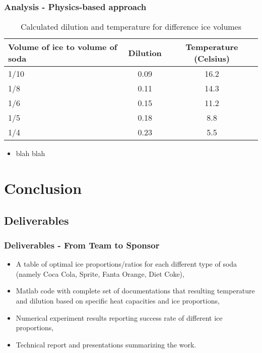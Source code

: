 \documentclass[compress,handout,10pt]{beamer}
\let\olditem\item
\renewcommand{\item}{\setlength{\itemsep}{0.5\baselineskip}\olditem}
\begin{document}
\begin{frame}
    \frametitle{Analysis - Physics-based approach}
\begin{table}[ h]
\centering
\begin{tabular}{ l || c|c}
 Volume of ice to volume of soda &Dilution &Temperature (Celsius) \\
\hline  
1/10 & 0.09&16.2\\ 
\hline  
1/8 & 0.11&14.3\\ 
\hline 
1/6 & 0.15&11.2\\ 
\hline 
1/5 & 0.18&8.8\\ 
\hline 
1/4 & 0.23&5.5\\ 
\hline    
\end{tabular}
\caption{Calculated dilution and temperature for difference ice volumes}
\end{table}

\begin{itemize}
\item blah blah
\end{itemize}

\end{frame}


\section{Conclusion}
\subsection{Deliverables}
\begin{frame}
    \frametitle{Deliverables - From Team to Sponsor}


\begin{itemize}
    \item A table of optimal ice proportions/ratios for each different type of soda (namely Coca Cola, Sprite, Fanta Orange, Diet Coke),
    \item Matlab code with complete set of documentations that resulting temperature and dilution based on specific heat capacities and ice proportions,
    \item Numerical experiment results reporting success rate of different ice proportions,
    \item Technical report and presentations summarizing the work. 
\end{itemize}


\end{frame}
\end{document}
